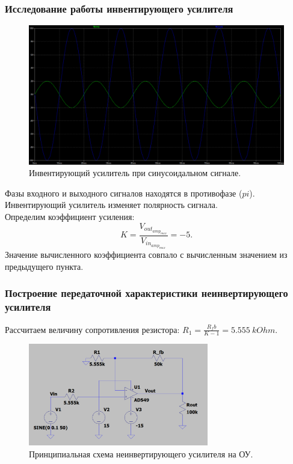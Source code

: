 \documentclass[12pt]{article}
\begin{document}
\subsubsection*{Исследование работы инвентирующего усилителя}
\begin{figure}[H]
    \centering
    \includegraphics[width=\textwidth]{1_sin_in_out.png}
    \caption{Инвентирующий усилитель при синусоидальном сигнале.}
    \label{fig:1_sin_in_out}
\end{figure}
Фазы входного и выходного сигналов находятся в противофазе ($pi$). \\
Инвентирующий усилитель изменяет полярность сигнала. \\
Определим коэффициент усиления:
\[
    K = \frac{V_{out_{amp_{max}}}}{V_{in_{amp_{max}}}} = -5.
\]
Значение вычисленного коэффициента совпало с вычисленным значением из предыдущего пункта.

\subsubsection*{Построение передаточной характеристики неинвертирующего усилителя}
Рассчитаем величину сопротивления резистора: $R_1 = \frac{R_fb}{K-1} = 5.555 \ kOhm.$
\begin{figure}[H]
    \centering
    \includegraphics[width=0.7\textwidth]{2_scheme.png}
    \caption{Принципиальная схема неинвертирующего усилителя на ОУ.}
    \label{fig:2_scheme}
\end{figure}
\end{document}
